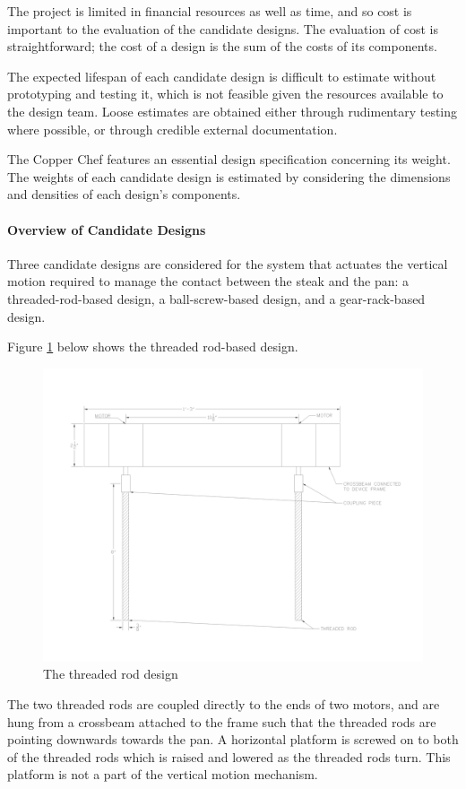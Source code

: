 \documentclass[11pt]{article}
\newcommand{\subsubsubsection}[1]{\paragraph{#1}\mbox{}}
\begin{document}
The project is limited in financial resources as well as time, and so cost is important to the evaluation of the candidate designs.
The evaluation of cost is straightforward;  the cost of a design is the sum of the costs of its components.

The expected lifespan of each candidate design is difficult to estimate without prototyping and testing it, which is not feasible given the resources available to the design team.
Loose estimates are obtained either through rudimentary testing where possible, or through credible external documentation.

The Copper Chef features an essential design specification concerning its weight.
The weights of each candidate design is estimated by considering the dimensions and densities of each design’s components.

\subsubsubsection{Overview of Candidate Designs}

\noindent
Three candidate designs are considered for the system that actuates the vertical motion required to manage the contact between the steak and the pan: a threaded-rod-based design, a ball-screw-based design, and a gear-rack-based design.

Figure \ref{fig:threaded rod} below shows the threaded rod-based design.

\begin{figure}[H]
  \centering
  \includegraphics[width=0.6\linewidth]{res/threaded_rod.png}
  \caption{The threaded rod design}
  \label{fig:threaded rod}
\end{figure}

The two threaded rods are coupled directly to the ends of two motors, and are hung from a crossbeam attached to the frame such that the threaded rods are pointing downwards towards the pan.
A horizontal platform is screwed on to both of the threaded rods which is raised and lowered as the threaded rods turn.
This platform is not a part of the vertical motion mechanism.
\end{document}
